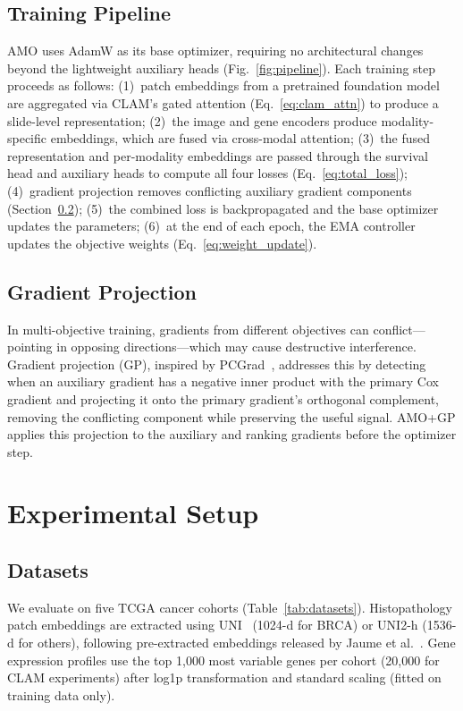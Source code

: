 \documentclass[10pt,twocolumn,letterpaper]{article}
\begin{document}
\subsection{Training Pipeline}

AMO uses AdamW as its base optimizer, requiring no architectural
changes beyond the lightweight auxiliary heads
(Fig.~\ref{fig:pipeline}). Each training step proceeds as follows: (1)~patch embeddings from a pretrained
foundation model are aggregated via CLAM's gated attention
(Eq.~\ref{eq:clam_attn}) to produce a slide-level representation;
(2)~the image and gene encoders produce modality-specific
embeddings, which are fused via cross-modal attention; (3)~the fused representation and per-modality
embeddings are passed through the survival head and auxiliary heads
to compute all four losses (Eq.~\ref{eq:total_loss}); (4)~gradient projection removes conflicting
auxiliary gradient components (Section~\ref{sec:gp}); (5)~the
combined loss is backpropagated and the base optimizer updates the
parameters; (6)~at the end of each epoch, the EMA controller
updates the objective weights (Eq.~\ref{eq:weight_update}).

\subsection{Gradient Projection}
\label{sec:gp}

In multi-objective training, gradients from different objectives can
conflict---pointing in opposing directions---which may cause
destructive interference. Gradient projection (GP), inspired by
PCGrad~\cite{yu2020pcgrad}, addresses this by detecting when an
auxiliary gradient has a negative inner product with the primary Cox
gradient and projecting it onto the primary gradient's orthogonal
complement, removing the conflicting component while preserving the
useful signal. AMO+GP applies this projection to the auxiliary and
ranking gradients before the optimizer step.


\section{Experimental Setup}

\subsection{Datasets}

We evaluate on five TCGA cancer cohorts
(Table~\ref{tab:datasets}). Histopathology patch embeddings are
extracted using UNI~\cite{chen2024uni} (1024-d for BRCA) or UNI2-h
(1536-d for others), following pre-extracted embeddings released by
Jaume et al.~\cite{jaume2024tangle}. Gene expression profiles use
the top 1,000 most variable genes per cohort (20,000 for CLAM
experiments) after log1p transformation and standard scaling (fitted
on training data only).
\end{document}
